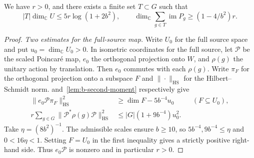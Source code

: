 \begin{theorem}
\label{thm:enough-forms}
\emitthmsource
We have $r>0$, and there exists a finite set $T\subset G$ such that
\begin{equation}
  |T|\dim_{\mathbb C}U\le 5r\log(1+2b^2),\qquad
  \dim_{\mathbb C}\sum_{g\in T}\operatorname{im}P_g
        \ge (1-4/b^2)r.
\label{eq:b-spanning}
\end{equation}
\end{theorem}
\begin{proof}
\emph{Two estimates for the full-source map.}
Write $U_0$ for the full source space and put $u_0=\dim_{\mathbb C}U_0>0$. In isometric coordinates for the full source, let $\mathcal P$ be the scaled Poincaré map, $e_0$ the orthogonal projection onto $W$, and $\rho(g)$ the unitary action by translation. Then $e_0$ commutes with each $\rho(g)$. Write $\pi_F$ for the orthogonal projection onto a subspace $F$ and $\|\cdot\|_{\mathrm{HS}}$ for the Hilbert--Schmidt norm.  and~\ref{lem:b-second-moment} respectively give
\begin{align*}
 \|e_0\mathcal P\pi_F\|_{\mathrm{HS}}^2
 &\ge \dim F-5b^{-4}u_0 &&(F\subseteq U_0),\\
 r\sum_{g\in G}\|\mathcal P^*\rho(g)\mathcal P\|_{\mathrm{HS}}^2
 &\le |G|(1+9b^{-4})u_0^2.
\end{align*}
Take $\eta=(8b^2)^{-1}$. The admissible scales ensure $b\ge10$, so
$5b^{-4},9b^{-4}\le\eta$ and $0<16\eta<1$. Setting $F=U_0$ in the first inequality gives a strictly positive right-hand side. Thus $e_0\mathcal P$ is nonzero and in particular $r>0$.


\end{proof}

